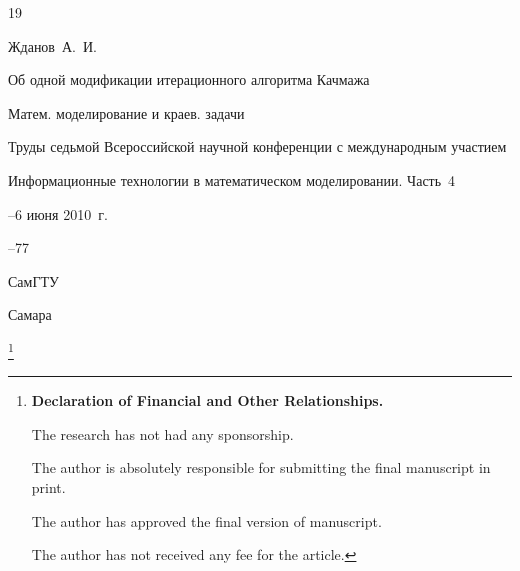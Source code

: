\begin{thebibliography}{19}














\by Жданов~А.~И.

\paper Об одной модификации итерационного алгоритма Качмажа

\serial Матем. моделирование и краев. задачи

\inbook Труды седьмой Всероссийской научной конференции с международным участием

\bookinfo Информационные технологии в математическом моделировании. \rm Часть~4

–6 июня 2010~г.


--77

\publ СамГТУ

\publaddr Самара




\end{thebibliography}



\RuDate



\bigskip



\makeentitle





\thanks{{\bf Declaration of Financial and Other Relationships.}

The research has not had any sponsorship.

The author is absolutely responsible for submitting the final manuscript in print.

The author has approved the final version of manuscript.

The author has not received any fee for the article.

}





